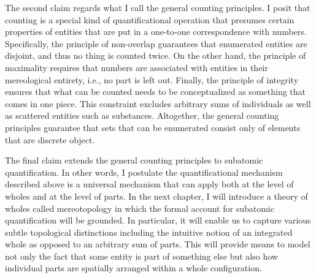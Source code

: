 The second claim regards what I call the general counting principles. I posit that counting is a special kind of quantificational operation that presumes certain properties of entities that are put in a one-to-one correspondence with numbers. Specifically, the principle of non-overlap guarantees that enumerated entities are disjoint, and thus no thing is counted twice. On the other hand, the principle of maximality requires that numbers are associated with entities in their mereological entirety, i.e., no part is left out. Finally, the principle of integrity ensures that what can be counted needs to be conceptualized as something that comes in one piece. This constraint excludes arbitrary sums of individuals as well as scattered entities such as substances. Altogether, the general counting principles guarantee that sets that can be enumerated consist only of elements that are discrete object.

The final claim extends the general counting principles to subatomic quantification. In other words, I postulate the quantificational mechanism described above is a universal mechanism that can apply both at the level of wholes and at the level of parts. In the next chapter, I will introduce a theory of wholes called mereotopology in which the formal account for subatomic quantification will be grounded. In particular, it will enable us to capture various subtle topological distinctions including the intuitive notion of an integrated whole as opposed to an arbitrary sum of parts. This will provide means to model not only the fact that some entity is part of something else but also how individual parts are spatially arranged within a whole configuration.
